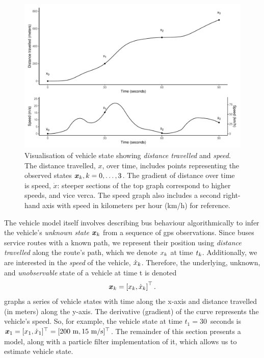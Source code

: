 \begin{knitrout}\small
{}\color{fgcolor}\begin{figure}

{\centering \includegraphics[width=\textwidth]{figure/vehicle_state-1} 

}

\caption[Visualisation of vehicle state showing \emph{distance travelled} and \emph{speed}]{Visualisation of vehicle state showing \emph{distance travelled} and \emph{speed}. The distance travelled, $x$, over time, includes points representing the observed states $\boldsymbol x_k, k=0,\ldots,3$. The gradient of distance over time is speed, $\dot x$: steeper sections of the top graph correspond to higher speeds, and vice verca. The speed graph also includes a second right-hand axis with speed in kilometers per hour (km/h) for reference.}\label{fig:vehicle_state}
\end{figure}


\end{knitrout}

The vehicle model itself involves describing bus behaviour algorithmically to infer the vehicle's \emph{unknown state} $\boldsymbol x_k$ from a sequence of \gls{gps} observations. Since buses service routes with a known path, we represent their position using \emph{distance travelled} along the route's path, which we denote $x_k$ at time $t_k$. Additionally, we are interested in the \emph{speed} of the vehicle, $\dot x_k$. Therefore, the underlying, unknown, and \emph{unobservable} state of a vehicle at time t is denoted
\begin{equation}
\label{eq:vehicle_state}
\boldsymbol x_k = \left[x_k, \dot x_k\right]^\top.
\end{equation}
 graphs a series of vehicle states with time along the x-axis and distance travelled (in meters) along the y-axis. The derivative (gradient) of the curve represents the vehicle's speed. So, for example, the vehicle state at time $t_1 = 30$~seconds is $\boldsymbol x_1 = [x_1, \dot x_1]^\top = [200~\text{m}, 15~\text{m/s}]^\top$. The remainder of this section presents a model, along with a particle filter implementation of it, which allows us to estimate vehicle state.

